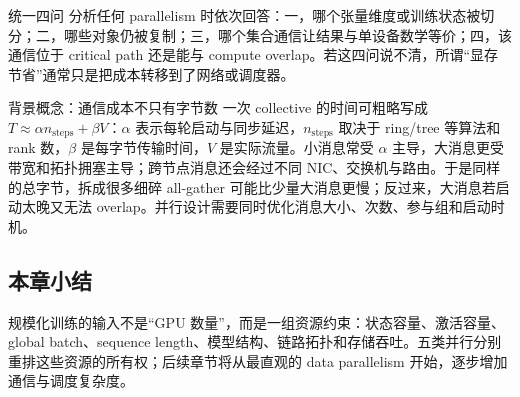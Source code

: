 
\begin{importantbox}{统一四问}
分析任何 parallelism 时依次回答：一，哪个张量维度或训练状态被切分；二，哪些对象仍被复制；三，哪个集合通信让结果与单设备数学等价；四，该通信位于 critical path 还是能与 compute overlap。若这四问说不清，所谓“显存节省”通常只是把成本转移到了网络或调度器。
\end{importantbox}

\begin{knowledgebox}{背景概念：通信成本不只有字节数}
一次 collective 的时间可粗略写成 $T\approx \alpha n_{\mathrm{steps}}+\beta V$：$\alpha$ 表示每轮启动与同步延迟，$n_{\mathrm{steps}}$ 取决于 ring/tree 等算法和 rank 数，$\beta$ 是每字节传输时间，$V$ 是实际流量。小消息常受 $\alpha$ 主导，大消息更受带宽和拓扑拥塞主导；跨节点消息还会经过不同 NIC、交换机与路由。于是同样的总字节，拆成很多细碎 all-gather 可能比少量大消息更慢；反过来，大消息若启动太晚又无法 overlap。并行设计需要同时优化消息大小、次数、参与组和启动时机。
\end{knowledgebox}

\subsection{本章小结}

规模化训练的输入不是“GPU 数量”，而是一组资源约束：状态容量、激活容量、global batch、sequence length、模型结构、链路拓扑和存储吞吐。五类并行分别重排这些资源的所有权；后续章节将从最直观的 data parallelism 开始，逐步增加通信与调度复杂度。

